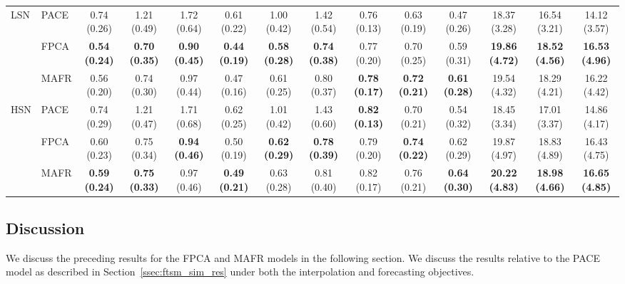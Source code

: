 \begin{landscape}
\begin{table}
{\begin{tabular}{l l c c c c c c c c c c c c}
		\midrule
		\multirow{3}{*}{LSN} & PACE & 0.74 (0.26) & 1.21 (0.49) & 1.72 (0.64) & 0.61 (0.22) & 1.00 (0.42) & 1.42 (0.54) & 0.76 (0.13) & 0.63 (0.19) & 0.47 (0.26)  & 18.37 (3.28) & 16.54 (3.21) & 14.12 (3.57) \\
		& FPCA  & \textbf{0.54 (0.24)} & \textbf{0.70 (0.35)} & \textbf{0.90 (0.45)} & \textbf{0.44 (0.19)} & \textbf{0.58 (0.28)} & \textbf{0.74 (0.38)} & 0.77 (0.20) & 0.70 (0.25) & 0.59 (0.31) & \textbf{19.86 (4.72)} & \textbf{18.52 (4.56)} & \textbf{16.53 (4.96)}  \\
		& MAFR  & 0.56 (0.20) & 0.74 (0.30) & 0.97 (0.44) & 0.47 (0.16) & 0.61 (0.25) & 0.80 (0.37) & \textbf{0.78 (0.17)} & \textbf{0.72 (0.21)} & \textbf{0.61 (0.28)} & 19.54 (4.32) & 18.29 (4.21) & 16.22 (4.42) \\
		\midrule
		\multirow{3}{*}{HSN} & PACE & 0.74 (0.29) & 1.21 (0.47) & 1.71 (0.68) & 0.62 (0.25) & 1.01 (0.42) & 1.43 (0.60) & \textbf{0.82 (0.13)} & 0.70 (0.21) & 0.54 (0.32) & 18.45 (3.34) & 17.01 (3.37) & 14.86 (4.17)  \\
		& FPCA  & 0.60 (0.23) & 0.75 (0.34) & \textbf{0.94 (0.46)} & 0.50 (0.19) & \textbf{0.62 (0.29)} & \textbf{0.78 (0.39)} & 0.79 (0.20) & \textbf{0.74 (0.22)} & 0.62 (0.29) & 19.87 (4.97) & 18.83 (4.89) & 16.43 (4.75)  \\
		& MAFR  & \textbf{0.59 (0.24)} & \textbf{0.75 (0.33)} & 0.97 (0.46) & \textbf{0.49 (0.21)} & 0.63 (0.28) & 0.81 (0.40) & 0.82 (0.17) & 0.76 (0.21) & \textbf{0.64 (0.30)}  & \textbf{20.22 (4.83)} & \textbf{18.98 (4.66)} & \textbf{16.65 (4.85)} \\
		\bottomrule
	\end{tabular}}
\end{table}
\end{landscape}

\subsection{Discussion \label{ssec:ftsm_sim_disc}}

We discuss the preceding results for the FPCA and MAFR models in the following section.
We discuss the results relative to the PACE model as described in Section~\ref{ssec:ftsm_sim_res} under both the interpolation and forecasting objectives.

